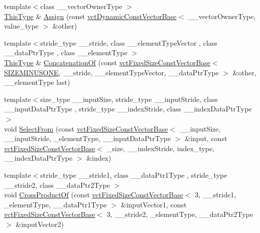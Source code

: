 \begin{DoxyCompactItemize}
\item 
{\footnotesize template$<$class \-\_\-\-\_\-vector\-Owner\-Type $>$ }\\\hyperlink{classvct_fixed_size_const_vector_base_a071063bc4fa43112cc287b2dbef53180}{This\-Type} \& \hyperlink{classvct_fixed_size_vector_base_aa65ad02437ef2ac473a5d5b0de9e48e1}{Assign} (const \hyperlink{classvct_dynamic_const_vector_base}{vct\-Dynamic\-Const\-Vector\-Base}$<$ \-\_\-\-\_\-vector\-Owner\-Type, value\-\_\-type $>$ \&other)
\item 
{\footnotesize template$<$stride\-\_\-type \-\_\-\-\_\-stride, class \-\_\-\-\_\-element\-Type\-Vector , class \-\_\-\-\_\-data\-Ptr\-Type , class \-\_\-\-\_\-element\-Type $>$ }\\\hyperlink{classvct_fixed_size_const_vector_base_a071063bc4fa43112cc287b2dbef53180}{This\-Type} \& \hyperlink{classvct_fixed_size_vector_base_a54bd491ac4979556abab22208213a31a}{Concatenation\-Of} (const \hyperlink{classvct_fixed_size_const_vector_base}{vct\-Fixed\-Size\-Const\-Vector\-Base}$<$ \hyperlink{classvct_fixed_size_vector_base_a62a887358e152bf19a5f474546afa3c3acee84c36d2ff88a921ce7d01e86c4676}{S\-I\-Z\-E\-M\-I\-N\-U\-S\-O\-N\-E}, \-\_\-\-\_\-stride, \-\_\-\-\_\-element\-Type\-Vector, \-\_\-\-\_\-data\-Ptr\-Type $>$ \&other, \-\_\-\-\_\-element\-Type last)
\item 
{\footnotesize template$<$size\-\_\-type \-\_\-\-\_\-input\-Size, stride\-\_\-type \-\_\-\-\_\-input\-Stride, class \-\_\-\-\_\-input\-Data\-Ptr\-Type , stride\-\_\-type \-\_\-\-\_\-index\-Stride, class \-\_\-\-\_\-index\-Data\-Ptr\-Type $>$ }\\void \hyperlink{classvct_fixed_size_vector_base_a51d2bd09e0aaefe5ab1d4d5b1104fa9b}{Select\-From} (const \hyperlink{classvct_fixed_size_const_vector_base}{vct\-Fixed\-Size\-Const\-Vector\-Base}$<$ \-\_\-\-\_\-input\-Size, \-\_\-\-\_\-input\-Stride, \-\_\-element\-Type, \-\_\-\-\_\-input\-Data\-Ptr\-Type $>$ \&input, const \hyperlink{classvct_fixed_size_const_vector_base}{vct\-Fixed\-Size\-Const\-Vector\-Base}$<$ \-\_\-size, \-\_\-\-\_\-index\-Stride, index\-\_\-type, \-\_\-\-\_\-index\-Data\-Ptr\-Type $>$ \&index)
\item 
{\footnotesize template$<$stride\-\_\-type \-\_\-\-\_\-stride1, class \-\_\-\-\_\-data\-Ptr1\-Type , stride\-\_\-type \-\_\-\-\_\-stride2, class \-\_\-\-\_\-data\-Ptr2\-Type $>$ }\\void \hyperlink{classvct_fixed_size_vector_base_ac172908fff49e7f55c1db12ed30da840}{Cross\-Product\-Of} (const \hyperlink{classvct_fixed_size_const_vector_base}{vct\-Fixed\-Size\-Const\-Vector\-Base}$<$ 3, \-\_\-\-\_\-stride1, \-\_\-element\-Type, \-\_\-\-\_\-data\-Ptr1\-Type $>$ \&input\-Vector1, const \hyperlink{classvct_fixed_size_const_vector_base}{vct\-Fixed\-Size\-Const\-Vector\-Base}$<$ 3, \-\_\-\-\_\-stride2, \-\_\-element\-Type, \-\_\-\-\_\-data\-Ptr2\-Type $>$ \&input\-Vector2)

\end{DoxyCompactItemize}
